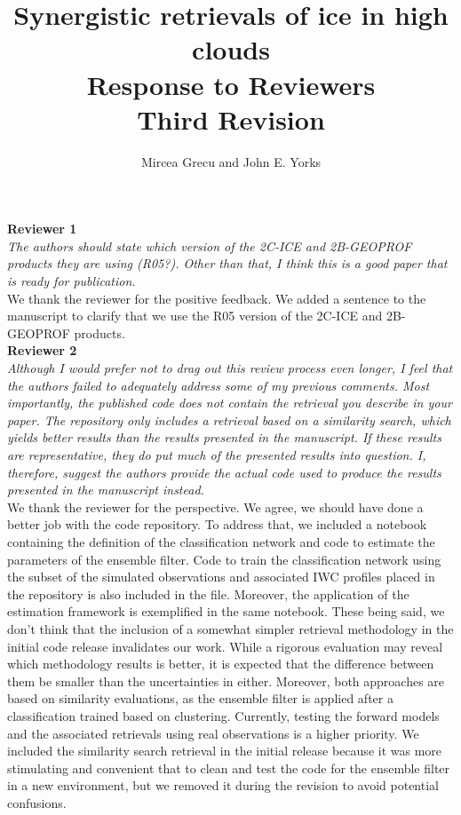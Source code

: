 \documentclass[12pt]{article}
\author{Mircea Grecu and John E. Yorks}
\title{Synergistic retrievals of ice in high clouds\\
Response to Reviewers\\Third Revision}
\date{}
\begin{document}
\maketitle

\noindent \textbf{Reviewer 1}\\

\noindent\textit{The authors should state which version of the 2C-ICE and 2B-GEOPROF products they are using (R05?). Other than that, I think this is a good paper that is 
ready for publication.}\\

\noindent We thank the reviewer for the positive feedback. We added a sentence to the manuscript to clarify that we use the R05 version of the 2C-ICE and 2B-GEOPROF products.\\

\noindent \textbf{Reviewer 2}\\

\noindent\textit{Although I would prefer not to drag out this review process even longer, I feel that the authors failed to adequately address some of my previous comments. Most importantly, the published code does not contain the retrieval you describe in your paper. The repository only includes a retrieval based on a similarity search, which yields better results than the results presented in the manuscript. If these results are representative, they do put much of the presented results into question. I, therefore, suggest the authors provide the actual code used to produce the results presented in the manuscript instead.}\\

\noindent We thank the reviewer for the perspective. We agree, we should have done a better job with the code repository. To address that, we included a notebook containing the definition of the classification network and code to estimate the parameters of the ensemble filter.  Code to train the classification network using the subset of the simulated observations and associated IWC profiles placed in the repository is also included in the file.  Moreover, the application of the estimation framework is exemplified in the same notebook.  These being said, we don't think that the inclusion of a somewhat simpler retrieval methodology in the initial code release invalidates our work.  While a rigorous evaluation may reveal which methodology results is better, it is expected that the difference between them be smaller than the uncertainties in either. Moreover, both approaches are based on similarity evaluations, as the ensemble filter is applied after a classification trained based on clustering. Currently, testing the forward models and the associated retrievals using real observations is a higher priority. We included the similarity search retrieval in the initial release because it was more stimulating and convenient that to clean and test the code for the ensemble filter in a new environment, but we removed it during the revision to avoid potential confusions.\\
\end{document}
